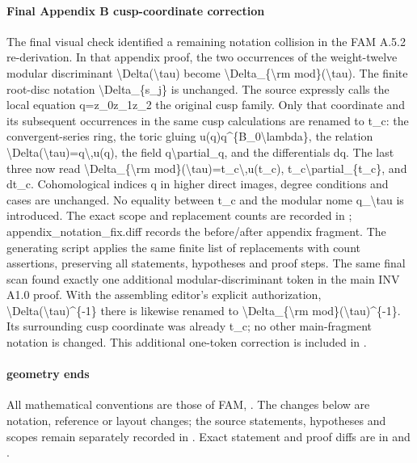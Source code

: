 \paragraph{Final Appendix B cusp-coordinate correction}
The final visual check identified a remaining notation collision in the FAM A.5.2 re-derivation. In that appendix proof, the two occurrences of the weight-twelve modular discriminant \textbackslash{}Delta(\textbackslash{}tau) become \textbackslash{}Delta\_\allowbreak{}\{\textbackslash{}rm mod\}(\textbackslash{}tau). The finite root-disc notation \textbackslash{}Delta\_\allowbreak{}\{s\_\allowbreak{}j\} is unchanged.
The source expressly calls the local equation q=z\_\allowbreak{}0z\_\allowbreak{}1z\_\allowbreak{}2 the original cusp family. Only that coordinate and its subsequent occurrences in the same cusp calculations are renamed to t\_\allowbreak{}c:\allowbreak{} the convergent-series ring, the toric gluing u(q)q\textasciicircum{}\{B\_\allowbreak{}0\textbackslash{}lambda\}, the relation \textbackslash{}Delta(\textbackslash{}tau)=q\textbackslash{},u(q), the field q\textbackslash{}partial\_\allowbreak{}q, and the differentials dq. The last three now read \textbackslash{}Delta\_\allowbreak{}\{\textbackslash{}rm mod\}(\textbackslash{}tau)=t\_\allowbreak{}c\textbackslash{},u(t\_\allowbreak{}c), t\_\allowbreak{}c\textbackslash{}partial\_\allowbreak{}\{t\_\allowbreak{}c\}, and dt\_\allowbreak{}c. Cohomological indices q in higher direct images, degree conditions and cases are unchanged. No equality between t\_\allowbreak{}c and the modular nome q\_\allowbreak{}\textbackslash{}tau is introduced.
The exact scope and replacement counts are recorded in ; appendix\_\allowbreak{}notation\_\allowbreak{}fix.diff records the before/\allowbreak{}after appendix fragment. The generating script applies the same finite list of replacements with count assertions, preserving all statements, hypotheses and proof steps.
The same final scan found exactly one additional modular-discriminant token in the main INV A1.0 proof. With the assembling editor's explicit authorization, \textbackslash{}Delta(\textbackslash{}tau)\textasciicircum{}\{-1\} there is likewise renamed to \textbackslash{}Delta\_\allowbreak{}\{\textbackslash{}rm mod\}(\textbackslash{}tau)\textasciicircum{}\{-1\}. Its surrounding cusp coordinate was already t\_\allowbreak{}c; no other main-fragment notation is changed. This additional one-token correction is included in .
\paragraph{geometry ends}
All mathematical conventions are those of FAM, . The changes below are notation, reference or layout changes; the source statements, hypotheses and scopes remain separately recorded in . Exact statement and proof diffs are in  and .

